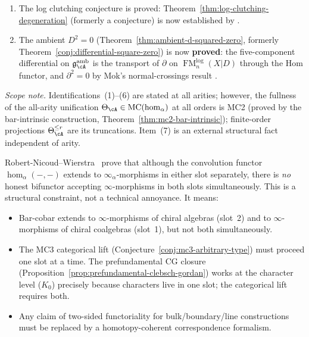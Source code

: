 \begin{remark}
\begin{enumerate}[label=\textup{(\arabic*)}]
  (Construction~\ref{constr:arity4-degeneration}).
\item The log clutching conjecture is proved:
  Theorem~\ref{thm:log-clutching-degeneration} (formerly a
  conjecture) is now established by \cite[Corollary~5.3.4]{Mok25}.
\item The ambient $D^2 = 0$
  (Theorem~\ref{thm:ambient-d-squared-zero}, formerly
  Theorem~\ref{conj:differential-square-zero}) is now
  \textbf{proved}: the five-component differential on
  $\mathfrak{g}^{\mathrm{amb}}_{\cA}$ is the transport of
  $\partial$ on $\operatorname{FM}_n^{\mathrm{log}}(X|D)$
  through the Hom functor, and $\partial^2 = 0$ by Mok's
  normal-crossings result \cite[Theorem~3.3.1(1)]{Mok25}.
\end{enumerate}
\emph{Scope note.}  Identifications~(1)--(6) are stated at all
arities; however, the fullness of the all-arity unification
$\Theta_\cA \in \mathrm{MC}(\operatorname{hom}_\alpha)$ at all orders
is MC2 (proved by the bar-intrinsic construction,
Theorem~\ref{thm:mc2-bar-intrinsic}); finite-order projections
$\Theta_\cA^{\leq r}$ are its truncations.  Item~(7) is an external structural
fact independent of arity.
\end{remark}

\begin{remark}
\label{rem:no-bifunctor}
Robert-Nicoud--Wierstra~\cite[Section~6]{RNW19} prove that although
the convolution functor $\operatorname{hom}_\alpha(-,-)$ extends to
$\infty_\alpha$-morphisms in either slot separately, there is
\emph{no} honest bifunctor accepting $\infty$-morphisms in both slots
simultaneously.  This is a structural constraint, not a technical
annoyance.  It means:
\begin{itemize}
\item Bar-cobar extends to $\infty$-morphisms of chiral algebras (slot~2)
  and to $\infty$-morphisms of chiral coalgebras (slot~1), but not both
  simultaneously.
\item The MC3 categorical lift
  (Conjecture~\ref{conj:mc3-arbitrary-type}) must proceed one slot at a
  time.  The prefundamental CG closure
  (Proposition~\ref{prop:prefundamental-clebsch-gordan}) works at the
  character level ($K_0$) precisely because characters live in one slot;
  the categorical lift requires both.
\item Any claim of two-sided functoriality for bulk/boundary/line
  constructions must be replaced by a homotopy-coherent correspondence
  formalism.
\end{itemize}
\end{remark}

